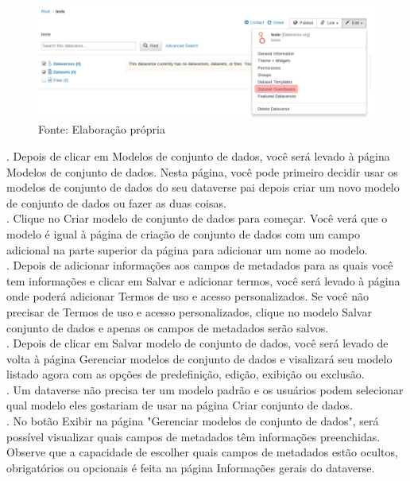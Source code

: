 \documentclass[12pt,hidelinks]{article}
\begin{document}
 \begin{figure}[H]
\centering
    \includegraphics[width=1.0\textwidth]{Prints/pn2.png}
    \caption{Fonte: Elaboração própria}
    \label{print7}
\end{figure}

. Depois de clicar em Modelos de conjunto de dados, você será levado à página Modelos de conjunto de dados. Nesta página, você pode primeiro decidir usar os modelos de conjunto de dados do seu dataverse pai depois criar um novo modelo de conjunto de dados ou fazer as duas coisas.\\

. Clique no Criar modelo de conjunto de dados para começar. Você verá que o modelo é igual à página de criação de conjunto de dados com um campo adicional na parte superior da página para adicionar um nome ao modelo.\\

. Depois de adicionar informações aos campos de metadados para as quais você tem informações e clicar em Salvar e adicionar termos, você será levado à página onde poderá adicionar Termos de uso e acesso personalizados. Se você não precisar de Termos de uso e acesso personalizados, clique no modelo Salvar conjunto de dados e apenas os campos de metadados serão salvos.\\

. Depois de clicar em Salvar modelo de conjunto de dados, você será levado de volta à página Gerenciar modelos de conjunto de dados e visalizará seu modelo listado agora com as opções de predefinição, edição, exibição ou exclusão.\\

. Um dataverse não precisa ter um modelo padrão e os usuários podem selecionar qual modelo eles gostariam de usar na página Criar conjunto de dados.\\

. No botão Exibir na página "Gerenciar modelos de conjunto de dados", será possível visualizar quais campos de metadados têm informações preenchidas. Observe que a capacidade de escolher quais campos de metadados estão ocultos, obrigatórios ou opcionais é feita na página Informações gerais do dataverse.
    
\end{document}
